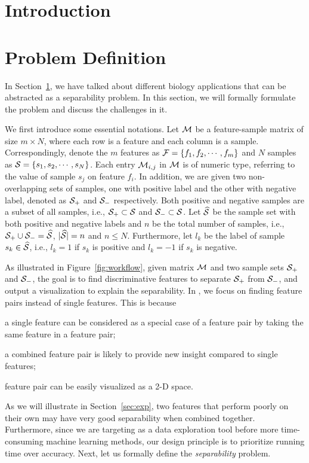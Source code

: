 

\section{Introduction}
\label{sec:intro}





\section{Problem Definition}\label{sec:prob}
In Section~\ref{sec:intro}, we have talked about different biology applications that can be abstracted as a separability problem. In this section, we will formally formulate the problem and discuss the challenges in it. 

We first introduce some essential notations. Let $\mm$ be a feature-sample matrix of size $m\times N$, where each row is a feature and each column is a sample. Correspondingly, denote the $m$ features as $\ff=\{f_1,f_2,\cdots,f_m\}$ and $N$ samples as $\sss=\{s_1,s_2,\cdots,s_N\}$. Each entry $\mm_{i,j}$ in $\mm$ is of numeric type, referring to the value of sample $s_j$ on feature $f_i$. In addition, we are given two non-overlapping sets of samples, one with positive label and the other with negative label, denoted as $\sss_+$ and $\sss_-$ respectively. Both positive and negative samples are a subset of all samples, i.e., $\sss_+\subset \sss$ and $\sss_-\subset \sss$. Let $\widehat{\sss}$ be the sample set with both positive and negative labels and $n$ be the total number of samples, i.e., $\sss_+\cup \sss_- = \widehat{\sss}$, $|\widehat{\sss}| = n$ and $n\leq N$. Furthermore, let $l_k$ be the label of sample $s_k\in \widehat{\sss}$, i.e., $l_k=1$ if $s_k$ is positive and $l_k=-1$ if $s_k$ is negative. 

As illustrated in Figure~\ref{fig:workflow}, given matrix $\mm$ and two sample sets $\sss_+$ and $\sss_-$, the goal is to find discriminative features to separate $\sss_+$ from $\sss_-$, and output a visualization to explain the separability. In \genviz, we focus on finding \topk feature pairs instead of \topk single features. This is because \begin{inparaenum}
\item a single feature can be considered as a special case of a feature pair by taking the same feature in a feature pair;
\item a combined feature pair is likely to provide new insight compared to single features;
\item feature pair can be easily visualized as a 2-D space.
\end{inparaenum}
As we will illustrate in Section~\ref{sec:exp}, two features that perform poorly on their own may have very good separability when combined together. Furthermore, since we are targeting as a data exploration tool before more time-consuming machine learning methods, our design principle is to prioritize running time over accuracy. Next, let us formally define the \textit{separability} problem. 

